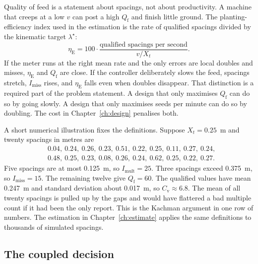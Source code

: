 Quality of feed is a statement about spacings, not about productivity. A machine that creeps at a low $v$ can post a high $Q_{\mathrm{f}}$ and finish little ground. The planting-efficiency index used in the estimation is the rate of qualified spacings divided by the kinematic target $\lambda^{\star}$:
\begin{equation}
\eta_{\mathrm{E}} = 100\cdot\frac{\text{qualified spacings per second}}{v/X_t}.
\label{eq:eta}
\end{equation}
If the meter runs at the right mean rate and the only errors are local doubles and misses, $\eta_{\mathrm{E}}$ and $Q_{\mathrm{f}}$ are close. If the controller deliberately slows the feed, spacings stretch, $I_{\mathrm{miss}}$ rises, and $\eta_{\mathrm{E}}$ falls even when doubles disappear. That distinction is a required part of the problem statement. A design that only maximises $Q_{\mathrm{f}}$ can do so by going slowly. A design that only maximises seeds per minute can do so by doubling. The cost in Chapter~\ref{ch:design} penalises both.

A short numerical illustration fixes the definitions. Suppose $X_t=0.25$~m and twenty spacings in metres are
\[
\begin{aligned}
&0.04,\ 0.24,\ 0.26,\ 0.23,\ 0.51,\ 0.22,\ 0.25,\ 0.11,\ 0.27,\ 0.24,\\
&0.48,\ 0.25,\ 0.23,\ 0.08,\ 0.26,\ 0.24,\ 0.62,\ 0.25,\ 0.22,\ 0.27.
\end{aligned}
\]
Five spacings are at most 0.125~m, so $I_{\mathrm{mult}}=25$. Three spacings exceed 0.375~m, so $I_{\mathrm{miss}}=15$. The remaining twelve give $Q_{\mathrm{f}}=60$. The qualified values have mean 0.247~m and standard deviation about 0.017~m, so $C_{\mathrm{v}}\approx 6.8$. The mean of all twenty spacings is pulled up by the gaps and would have flattered a bad multiple count if it had been the only report. This is the Kachman argument in one row of numbers. The estimation in Chapter~\ref{ch:estimate} applies the same definitions to thousands of simulated spacings.

\subsection{The coupled decision}

